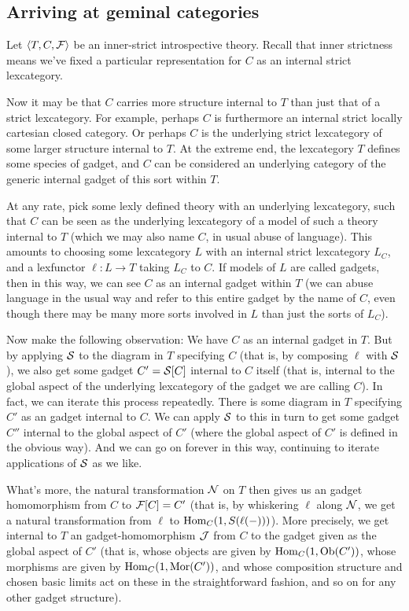 \subsection{Arriving at geminal categories}
\begin{observation}\label{IntrospContainsGLObservation}
Let $\langle T, C, \mathcal{F}\rangle$ be an inner-strict introspective theory. Recall that inner strictness means we've fixed a particular representation for $C$ as an internal strict lexcategory.

Now it may be that $C$ carries more structure internal to $T$ than just that of a strict lexcategory. For example, perhaps $C$ is furthermore an internal strict locally cartesian closed category. Or perhaps $C$ is the underlying strict lexcategory of some larger structure internal to $T$. At the extreme end, the lexcategory $T$ defines some species of gadget, and $C$ can be considered an underlying category of the generic internal gadget of this sort within $T$.

At any rate, pick some lexly defined theory with an underlying lexcategory, such that $C$ can be seen as the underlying lexcategory of a model of such a theory internal to $T$ (which we may also name $C$, in usual abuse of language). This amounts to choosing some lexcategory $L$ with an internal strict lexcategory $L_C$, and a lexfunctor $\ell: L \to T$ taking $L_C$ to $C$. If models of $L$ are called gadgets, then in this way, we can see $C$ as an internal gadget within $T$ (we can abuse language in the usual way and refer to this entire gadget by the name of $C$, even though there may be many more sorts involved in $L$ than just the sorts of $L_C$).

Now make the following observation: We have $C$ as an internal gadget in $T$. But by applying $\mathcal{S}$ to the diagram in $T$ specifying $C$ (that is, by composing $\ell$ with $\mathcal{S}$), we also get some gadget $C' = \mathcal{S}[C]$ internal to $C$ itself (that is, internal to the global aspect of the underlying lexcategory of the gadget we are calling $C$). In fact, we can iterate this process repeatedly. There is some diagram in $T$ specifying $C'$ as an gadget internal to $C$. We can apply $\mathcal{S}$ to this in turn to get some gadget $C''$ internal to the global aspect of $C'$ (where the global aspect of $C'$ is defined in the \TODO obvious way). And we can go on forever in this way, continuing to iterate applications of $\mathcal{S}$ as we like.

What's more, the natural transformation $\mathcal{N}$ on $T$ then gives us an gadget homomorphism from $C$ to $\mathcal{F}[C] = C'$ (that is, by whiskering $\ell$ along $\mathcal{N}$, we get a natural transformation from $\ell$ to $\operatorname{Hom}_C(1, S(\ell(-)))$). More precisely, we get internal to $T$ an gadget-homomorphism $\mathcal{J}$ from $C$ to the gadget given as the global aspect of $C'$ (that is, whose objects are given by $\operatorname{Hom}_C(1, \operatorname{Ob}(C'))$, whose morphisms are given by $\operatorname{Hom}_C(1, \operatorname{Mor}(C'))$, and whose composition structure and chosen basic limits act on these in the straightforward fashion, and so on for any other gadget structure).


\end{observation}
